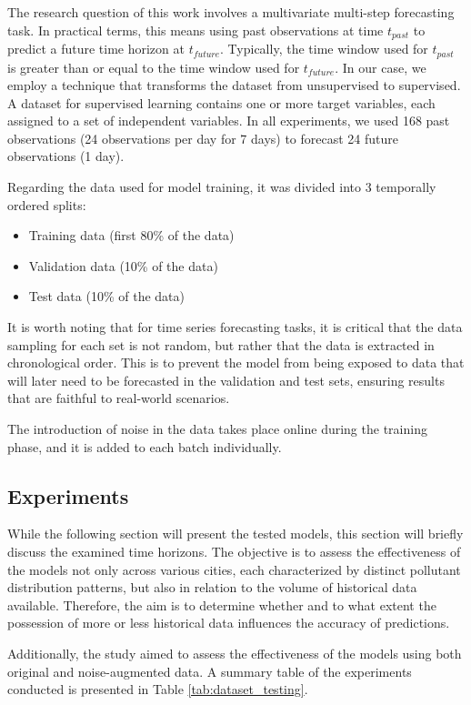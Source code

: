 The research question of this work involves a multivariate multi-step forecasting task. In practical terms, this means using past observations at time $t_{past}$ to predict a future time horizon at $t_{future}$. Typically, the time window used for $t_{past}$ is greater than or equal to the time window used for $t_{future}$.
In our case, we employ a technique that transforms the dataset from unsupervised to supervised. A dataset for supervised learning contains one or more target variables, each assigned to a set of independent variables.
In all experiments, we used 168 past observations (24 observations per day for 7 days) to forecast 24 future observations (1 day).

Regarding the data used for model training, it was divided into 3 temporally ordered splits:
\begin{itemize}
    \item Training data (first 80\% of the data)
    \item Validation data (10\% of the data)
    \item Test data (10\% of the data)
\end{itemize}

It is worth noting that for time series forecasting tasks, it is critical that the data sampling for each set is not random, but rather that the data is extracted in chronological order. This is to prevent the model from being exposed to data that will later need to be forecasted in the validation and test sets, ensuring results that are faithful to real-world scenarios.

The introduction of noise in the data takes place online during the training phase, and it is added to each batch individually.

\subsection{Experiments}
\label{subsec:experiments}
While the following section will present the tested models, this section will briefly discuss the examined time horizons. The objective is to assess the effectiveness of the models not only across various cities, each characterized by distinct pollutant distribution patterns, but also in relation to the volume of historical data available. Therefore, the aim is to determine whether and to what extent the possession of more or less historical data influences the accuracy of predictions.

Additionally, the study aimed to assess the effectiveness of the models using both original and noise-augmented data. A summary table of the experiments conducted is presented in Table \ref{tab:dataset_testing}.


